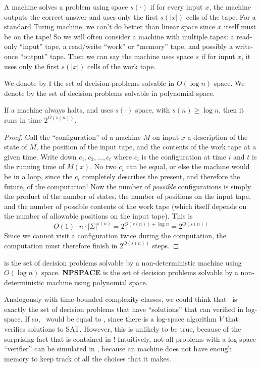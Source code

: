 A machine solves a problem using space $s(\cdot)$ if for every
input $x$, the machine outputs the correct answer and uses only
the first $s(|x|)$ cells of the tape.  For a standard Turing machine,
we can't do better than linear space since $x$ itself must be on the
tape!  So we will often consider a machine with multiple tapes: a
read-only ``input'' tape, a read/write ``work'' or ``memory'' tape,
and possibly a write-once ``output'' tape.  Then we can say
the machine uses space $s$ if for input $x$, it uses only the first
$s(|x|)$ cells of the work tape.

We denote by \l{} the set of decision problems solvable in $O(\log n)$ space.
We denote by \pspace{} the set of decision problems solvable in polynomial
space.

\begin{Thm}
If a machine always halts, and uses $s(\cdot)$ space, with $s(n) \ge \log n$,
then it runs in time $2^{O(s(n))}$.
\end{Thm}
\begin{proof}
Call the ``configuration'' of a machine $M$ on input $x$ a description of
the state of $M$, the position of the input tape, and the contents of the work
tape at a given time.  Write down $c_1, c_2, \ldots, c_t$ where $c_i$ is
the configuration at time $i$ and $t$ is the running time of $M(x)$.
No two $c_i$ can be equal, or else the machine would be in a loop, since
the $c_i$ completely describes the present, and therefore the future,
of the computation!  Now the number of {\it possible} configurations is
simply the product of the number of states, the number of positions on
the input tape, and the number of possible contents of the work tape
(which itself depends on the number of allowable positions on the input
tape).
This is
\begin{displaymath}
O(1) \cdot n \cdot |\Sigma|^{s(n)}
= 2^{O(s(n)) + \log n}
= 2^{O(s(n))}
\end{displaymath}
Since we cannot visit a configuration twice during the computation,
the computation must therefore finish in $2^{O(s(n))}$ steps.
\end{proof}

\nl{} is the set of decision problems solvable by a non-deterministic machine
using $O(\log n)$ space.  {\bf NPSPACE} is the set of decision problems solvable
by a non-deterministic machine using polynomial space.

Analogously with
time-bounded complexity classes, we could think that \nl\ is
exactly the set of decision problems that have ``solutions'' that
can verified in log-space. If so, \nl\ would be equal
to \np, since
there is a log-space algorithm $V$ that
verifies solutions to SAT.  However, this is unlikely to be true, because
of the surprising fact that \nl{} is contained in \p{}!  Intuitively,
not all problems with a log-space ``verifier'' can be simulated in
\nl{}, because an {\nl} machine does not have
enough memory to keep track of all the choices that it makes.

